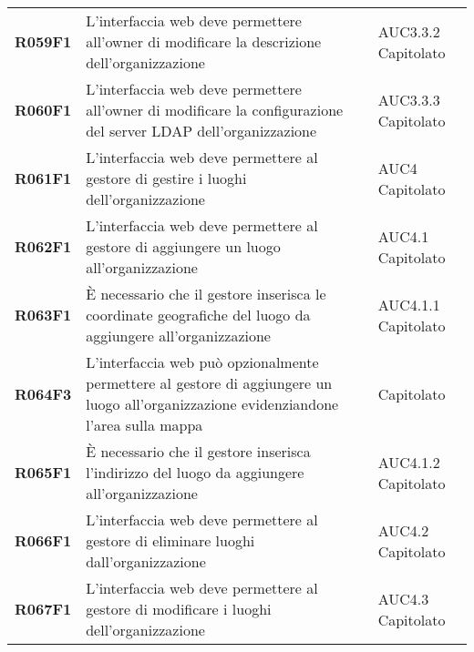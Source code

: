 \documentclass[../analisi-dei-requisiti.tex]{subfiles}
\begin{document}
\begin{longtable}[H]{>{\centering\bfseries}m{3cm} >{\centering}m{10cm} >{\centering\arraybackslash}m{3cm}}
  R059F1                               & L'interfaccia web deve permettere all'owner di modificare la descrizione dell'organizzazione                                                                                                            & AUC3.3.2 Capitolato           \\
  R060F1                               & L'interfaccia web deve permettere all'owner di modificare la configurazione del server LDAP dell'organizzazione                                                                                         & AUC3.3.3 Capitolato           \\

  R061F1                               & L'interfaccia web deve permettere al gestore di gestire i luoghi dell'organizzazione                                                                                                                    & AUC4 Capitolato               \\
  R062F1                               & L'interfaccia web deve permettere al gestore di aggiungere un luogo all'organizzazione                                                                                                                  & AUC4.1 Capitolato             \\
  R063F1                               & È necessario che il gestore inserisca le coordinate geografiche del luogo da aggiungere all'organizzazione                                                                                              & AUC4.1.1 Capitolato           \\
  R064F3                               & L'interfaccia web può opzionalmente permettere al gestore di aggiungere un luogo all'organizzazione evidenziandone l'area sulla mappa                                                                   & Capitolato                    \\
  R065F1                               & È necessario che il gestore inserisca l'indirizzo del luogo da aggiungere all'organizzazione                                                                                                            & AUC4.1.2 Capitolato           \\
  R066F1                               & L'interfaccia web deve permettere al gestore di eliminare luoghi dall'organizzazione                                                                                                                    & AUC4.2 Capitolato             \\
  R067F1                               & L'interfaccia web deve permettere al gestore di modificare i luoghi dell'organizzazione                                                                                                                 & AUC4.3 Capitolato             \\

\end{longtable}
\end{document}
